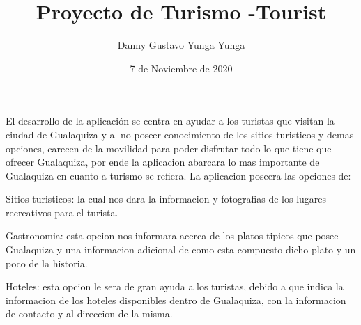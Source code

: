 \documentclass[a4paper,12pt]{article}
\title{Proyecto de Turismo \Gualaquiza-Tourist {}}
\author{Danny Gustavo Yunga Yunga}
\date{7 de Noviembre de 2020}
\begin{document}

\maketitle

El desarrollo de la aplicación se centra en ayudar a los turistas que visitan la ciudad de Gualaquiza y al no poseer conocimiento de los sitios turisticos y demas opciones, carecen de la movilidad para poder disfrutar todo lo que tiene que ofrecer Gualaquiza, por ende la aplicacion abarcara lo mas importante de Gualaquiza en cuanto a turismo se refiera. La aplicacion poseera las opciones de: 

Sitios turisticos: la cual nos dara la informacion y fotografias de los lugares recreativos para el turista.

Gastronomia: esta opcion nos informara acerca de los platos tipicos que posee Gualaquiza y una informacion adicional de como esta compuesto dicho plato y un poco de la historia.

Hoteles: esta opcion le sera de gran ayuda a los turistas, debido a que indica la informacion de los hoteles disponibles dentro de Gualaquiza, con la informacion de contacto y al direccion de la misma.
\end{document}
